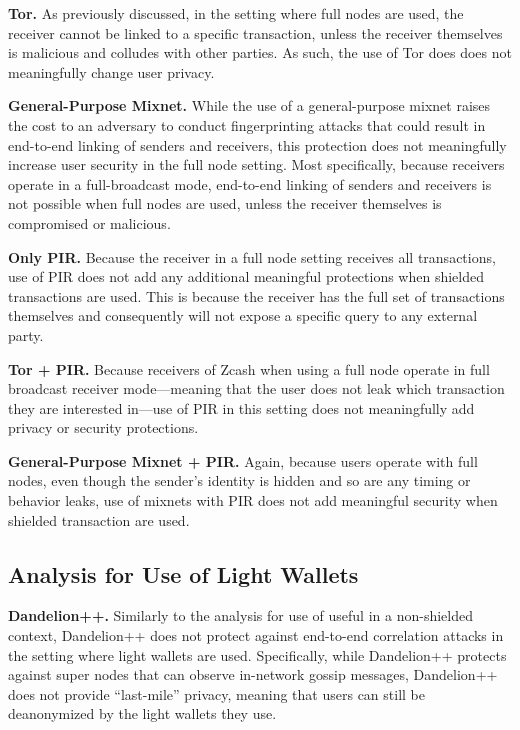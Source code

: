 \documentclass{article}
\begin{document}
\textbf{Tor.}
As previously discussed, in the setting where full nodes are used, the receiver cannot be linked
to a specific transaction, unless the receiver themselves is malicious and
colludes with other parties.
As such, the use of Tor does does not meaningfully change user privacy.

\textbf{General-Purpose Mixnet.}
While the use of a general-purpose mixnet raises the cost to an adversary to
conduct fingerprinting attacks that could result in end-to-end linking of
senders and receivers, this protection does not meaningfully increase user
security in the full node setting.
Most specifically, because receivers operate in a
full-broadcast mode, end-to-end linking of senders and receivers is not
possible when full nodes are used, unless the receiver themselves is
compromised or malicious.

\textbf{Only PIR.}
Because the receiver in a full node setting receives all transactions, use of
PIR does not add any additional meaningful protections when shielded
transactions are used. This is because the receiver has the full set of
transactions themselves and consequently will not expose a specific query to
any external party.

\textbf{Tor + PIR.}
Because receivers of Zcash when using a full node operate in full broadcast
receiver mode---meaning that the user
does not leak which transaction they are interested in---use
of PIR in this setting does not meaningfully add privacy or security
protections.

\textbf{General-Purpose Mixnet + PIR.}
Again, because users operate with full nodes, even though the sender's identity
is hidden and so are any timing or behavior leaks, use of mixnets with PIR does
not add meaningful security when shielded transaction are used.

\subsection{Analysis for Use of Light Wallets}

\textbf{Dandelion++.}
Similarly to the analysis for use of useful in a non-shielded context, Dandelion++ does not protect against
end-to-end correlation attacks in the setting where light wallets are used.
Specifically, while Dandelion++ protects against super nodes that can observe
in-network gossip messages, Dandelion++ does not provide ``last-mile'' privacy,
meaning that users can still be deanonymized by the light wallets they use.
\end{document}
